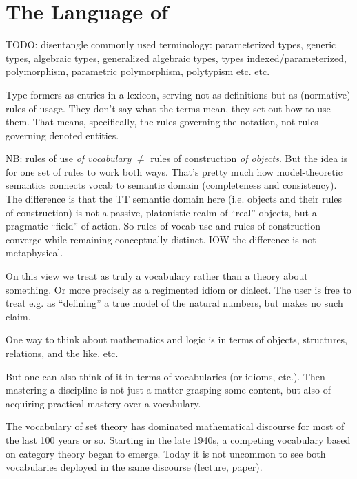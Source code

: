 \chapter{The Language of \HoTT}
\label{sect:hottlang}

\begin{ednote}
  TODO: disentangle commonly used terminology: parameterized types,
  generic types, algebraic types, generalized algebraic types, types
  indexed/parameterized, polymorphism, parametric polymorphism,
  polytypism etc. etc.
\end{ednote}

\begin{ednote}
  Type formers as entries in a \HoTT{} lexicon, serving not as
  definitions but as (normative) rules of usage.  They don't say what
  the terms mean, they set out how to use them.  That means,
  specifically, the rules governing the notation, not rules governing
  denoted entities.

  NB: rules of use \emph{of vocabulary} \(\neq\) rules of construction
  \emph{of objects}.  But the idea is for one set of rules to work
  both ways.  That's pretty much how model-theoretic semantics
  connects vocab to semantic domain (completeness and consistency).
  The difference is that the TT semantic domain here (i.e. objects and
  their rules of construction) is not a passive, platonistic realm of
  ``real'' objects, but a pragmatic ``field'' of action.  So rules of
  vocab use and rules of construction converge while remaining
  conceptually distinct.  IOW the difference is not metaphysical.

  On this view we treat \HoTT{} as truly a vocabulary rather than a
  theory about something.  Or more precisely as a regimented idiom or
  dialect.  The user is free to treat e.g. \N as ``defining'' a true
  model of the natural numbers, but \HoTT{} makes no such claim.
\end{ednote}

One way to think about mathematics and logic is in terms of objects,
structures, relations, and the like.  etc.

But one can also think of it in terms of vocabularies (or idioms,
etc.).  Then mastering a discipline is not just a matter grasping some
content, but also of acquiring practical mastery over a vocabulary.

The vocabulary of set theory has dominated mathematical discourse for
most of the last 100 years or so.  Starting in the late 1940s, a
competing vocabulary based on category theory began to emerge.  Today
it is not uncommon to see both vocabularies deployed in the same
discourse (lecture, paper).

